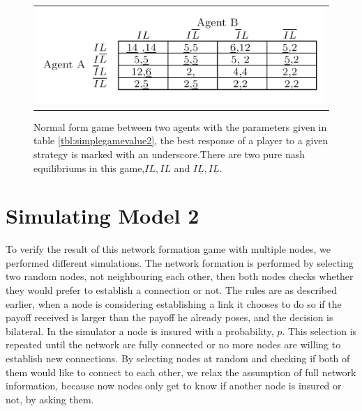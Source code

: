 \begin{figure}[h]
\centering
\begin{tabular}{@{}c@{}}
\includegraphics[width=1.0\textwidth]{../Figures/NotOptimalGameWithNumbers.png}
\end{tabular}
\caption[Caption for LOF]{Normal form game between two agents with the parameters given in table \ref{tbl:simplegamevalue2}, the best response of a player to a given strategy is marked with an underscore.There are two pure nash equilibriums in this game,$IL,IL$ and $I\underline{L},I\underline{L}$. \label{fig:NFnumbersViolating}}
\end{figure}


\section{Simulating Model 2}
To verify the result of this network formation game with multiple nodes, we performed different simulations. The network formation is performed by selecting two random nodes, not neighbouring each other, then both nodes checks whether they would prefer to establish a connection or not. The rules are as described earlier, when a node is considering establishing a link it chooses to do so if the payoff received is larger than the payoff he already poses, and the decision is bilateral. 
In the simulator a node is insured with a probability, $p$. This selection is repeated until the network are fully connected or no more nodes are willing to establish new connections.
By selecting nodes at random and checking if both of them would like to connect to each other, we relax the assumption of full network information, because now nodes only get to know if another node is insured or not, by asking them.

